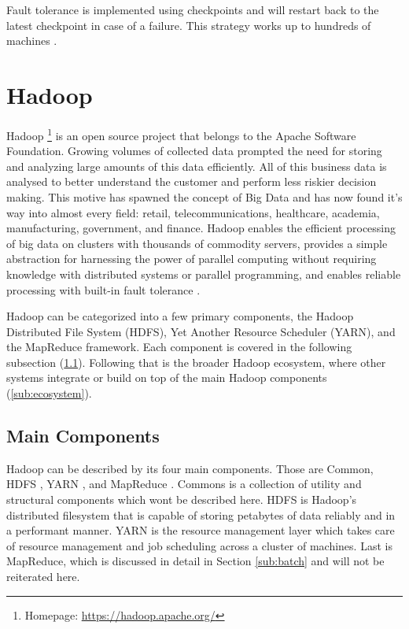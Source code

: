 \documentclass[12pt]{article}
\begin{document}
Fault tolerance is implemented using checkpoints and will restart back to the latest checkpoint in case of a failure. This strategy works up to hundreds of machines \cite{xing2015petuum}.





\section{Hadoop} \label{sec:hadoop}

Hadoop \footnote{Homepage: \url{https://hadoop.apache.org/}} is an open source project that belongs to the Apache Software Foundation. Growing volumes of collected data prompted the need for storing and analyzing large amounts of this data efficiently. All of this business data is analysed to better understand the customer and perform less riskier decision making. This motive has spawned the concept of Big Data and has now found it's way into almost every field: retail, telecommunications, healthcare, academia, manufacturing, government, and finance. Hadoop enables the efficient processing of big data on clusters with thousands of commodity servers, provides a simple abstraction for harnessing the power of parallel computing without requiring knowledge with distributed systems or parallel programming, and enables reliable processing with built-in fault tolerance \cite{zhang2016survey,singh2015survey}.

Hadoop can be categorized into a few primary components, the Hadoop Distributed File System (HDFS), Yet Another Resource Scheduler (YARN), and the MapReduce framework. Each component is covered in the following subsection (\ref{sub:components}). Following that is the broader Hadoop ecosystem, where other systems integrate or build on top of the main Hadoop components (\ref{sub:ecosystem}).



\subsection{Main Components} \label{sub:components}

Hadoop can be described by its four main components. Those are Common, HDFS \cite{hdfs}, YARN \cite{yarn}, and MapReduce \cite{dean2008mapreduce}. Commons is a collection of utility and structural components which wont be described here. HDFS is Hadoop's distributed filesystem that is capable of storing petabytes of data reliably and in a performant manner. YARN is the resource management layer which takes care of resource management and job scheduling across a cluster of machines. Last is MapReduce, which is discussed in detail in Section \ref{sub:batch} and will not be reiterated here.
\end{document}
